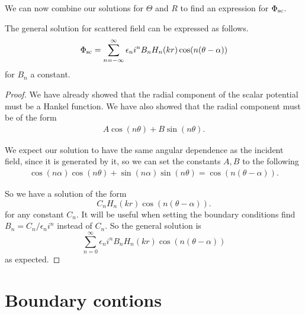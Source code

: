We can now combine our solutions for $\Theta$ and $R$ to find an expression for $\Phi_{\text{sc}}$.

\begin{propn}\label{eq:gen_sol_scatterin_outside_cylinder}
  The general solution for scattered field can be expressed as follows.
    \begin{equation} \label{eq:ch2_gen_eq_scattered_field}
        \Phi_{\text{sc}} = \sum^\infty_{n=-\infty} \epsilon_n i^n B_n H_n(kr) \cos(n(\theta-\alpha))
    \end{equation}
  for $B_n$ a constant.
\end{propn}
\begin{proof}
  We have already showed that the radial component of the scalar potential must be a Hankel function. We have also showed that the radial component must be of the form
    \begin{align*}
      A \cos(n\theta) + B \sin(n \theta).
    \end{align*}

  We expect our solution to have the same angular dependence as the incident field, since it is generated by it, so we can set the constants $A,B$ to the following
    \begin{gather*}
      \cos(n\alpha) \cos(n\theta) + \sin(n \alpha) \sin(n \theta)
      = \cos(n(\theta-\alpha)).
    \end{gather*}

  So we have a solution of the form
    \begin{equation}
      C_n H_n(kr) \cos(n(\theta-\alpha)).
    \end{equation}
  for any constant $C_n$. It will be useful when setting the boundary conditions find $ B_n = C_n/\epsilon_n i^n$ instead of $C_n$. So the general solution is
  \begin{equation}
    \sum^\infty_{n=0} \epsilon_n i^n B_n H_n(kr) \cos(n(\theta-\alpha))
  \end{equation}
  as expected.
\end{proof}


\section{Boundary contions}

